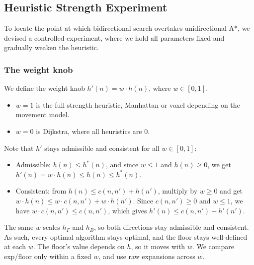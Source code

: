 \documentclass[letterpaper]{article} %
\begin{document}
\subsection{Heuristic Strength Experiment}
To locate the point at which bidirectional search overtakes unidirectional A*, we devised a controlled experiment, where we hold all parameters fixed and gradually weaken the heuristic.

\subsubsection{The weight knob}
We define the weight knob $h'(n)=w\cdot h(n)$, where $w \in [0,1]$.
\begin{itemize}
  \item $w=1$ is the full strength heuristic, Manhattan or voxel depending on the movement model.
  \item $w=0$ is Dijkstra, where all heuristics are 0.
\end{itemize} Note that $h'$ stays admissible and consistent for all $w \in [0,1]$:
\begin{itemize}
  \item Admissible: $h(n)\le h^*(n)$, and since $w \le 1$ and $h(n)\ge 0$, we get $h'(n) = w \cdot h(n) \le h(n) \le h^*(n)$.
  \item Consistent: from $h(n) \le c(n,n') + h(n')$, multiply by $w \ge 0$ and get $w \cdot h(n) \le w \cdot c(n, n') + w \cdot h(n')$. Since $c(n,n') \ge 0$ and $w \le 1$, we have $w \cdot c(n,n') \le c(n,n')$, which gives $h'(n) \le c(n,n') + h'(n')$.
\end{itemize} The same $w$ scales $h_F$ and $h_B$, so both directions stay admissible and consistent. As such, every optimal algorithm stays optimal, and the floor stays well-defined at each $w$. The floor's value depends on $h$, so it moves with $w$. We compare exp/floor only within a fixed $w$, and use raw expansions across $w$.
\end{document}
